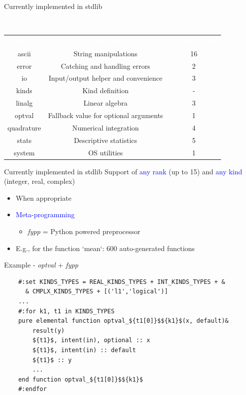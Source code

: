 \documentclass{beamer}
\begin{document}
\begin{frame}[c]{Currently implemented in stdlib}
	\begin{block}{~\vspace{0.5cm}}
	\vspace{-0.8cm}
	\begin{tabular}{ccc}
		\textcolor{white}{\bf Module} &\textcolor{white}{\bf Description} &\textcolor{white}{\bf \# procedures} \\
		ascii & String manipulations & 16\\
		error & Catching and handling errors & 2\\
		io & Input/output helper and convenience & 3\\
		kinds & Kind definition & -\\
		linalg & Linear algebra & 3\\
		optval & Fallback value for optional arguments & 1\\
		quadrature & Numerical integration & 4\\
		stats & Descriptive statistics & 5\\
		system & OS utilities & 1 \\
	\end{tabular}
	\end{block}
\end{frame}


\begin{frame}[c]{Currently implemented in stdlib}
	Support of \textcolor{blue}{any rank} (up to 15) and \textcolor{blue}{any kind}
	(\textcolor{mygreen}{integer}, \textcolor{mygreen}{real}, \textcolor{mygreen}{complex})
	\begin{itemize}
		\item When appropriate
		\item \textcolor{blue}{Meta-programming}
		\begin{itemize}
			\item \textit{fypp} = Python powered preprocessor
		\end{itemize}
		\item E.g., for the function `mean`: 600 auto-generated functions
	\end{itemize}
\end{frame}

\begin{frame}[fragile]{Example - \textit{optval} + \textit{fypp}}
	
	\begin{lstlisting}
	#:set KINDS_TYPES = REAL_KINDS_TYPES + INT_KINDS_TYPES + &
	  & CMPLX_KINDS_TYPES + [('l1','logical')]
	...
	#:for k1, t1 in KINDS_TYPES
	pure elemental function optval_${t1[0]}$${k1}$(x, default)&
	    result(y)
	    ${t1}$, intent(in), optional :: x
	    ${t1}$, intent(in) :: default
	    ${t1}$ :: y
	    ...
	end function optval_${t1[0]}$${k1}$
	#:endfor\end{lstlisting}

\end{frame}
\end{document}
